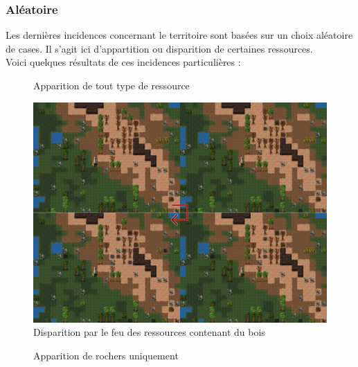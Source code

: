 \documentclass[a4paper]{article}
\newcommand{\alinea}{\hspace*{0.5cm}}
\begin{document}
        \subsubsection{Aléatoire}
          \alinea Les dernières incidences concernant le territoire sont basées sur un choix aléatoire de cases. Il s'agit ici d'appartition ou disparition de certaines ressources.\\
          \alinea Voici quelques résultats de ces incidences particulières :\\
          \begin{figure}
            \begin{center}
            \end{center}
            \caption{Apparition de tout type de ressource}
          \end{figure}
          \begin{figure}
            \begin{center}
              \includegraphics[scale=0.2]{img/BurnRessource.png}
            \end{center}
            \caption{Disparition par le feu des ressources contenant du bois}
          \end{figure}
          \begin{figure}
            \begin{center}
            \end{center}
            \caption{Apparition de rochers uniquement}
          \end{figure}
        
\end{document}
